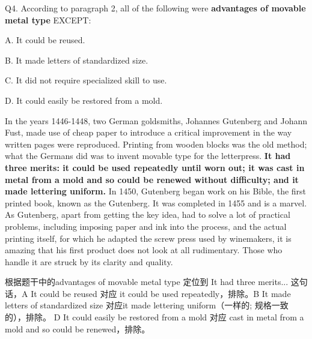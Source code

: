 \begin{blk}
    \begin{qst}
        Q4. According to paragraph 2, all of the following were \textbf{advantages of movable metal type} EXCEPT:
    \end{qst}

    \begin{chc}
        A. It could be reused.

        B. It made letters of standardized size.

        C. It did not require specialized skill to use.

        D. It could easily be restored from a mold.
    \end{chc}

    \begin{psgq}
        In the years 1446-1448, two German goldsmiths, Johannes Gutenberg and Johann Fust, made use of cheap paper to introduce a critical improvement in the way written pages were reproduced. Printing from wooden blocks was the old method; what the Germans did was to invent movable type for the letterpress. \textbf{It had three merits: it could be used repeatedly until worn out; it was cast in metal from a mold and so could be renewed without difficulty; and it made lettering uniform.} In 1450, Gutenberg began work on his Bible, the first printed book, known as the Gutenberg. It was completed in 1455 and is a marvel. As Gutenberg, apart from getting the key idea, had to solve a lot of practical problems, including imposing paper and ink into the process, and the actual printing itself, for which he adapted the screw press used by winemakers, it is amazing that his first product does not look at all rudimentary. Those who handle it are struck by its clarity and quality.
    \end{psgq}

    \begin{nlz}
        根据题干中的advantages of movable metal type 定位到 It had three merits... 这句话，A  It could be reused  对应 it could be used repeatedly，排除。B It made letters of standardized size 对应it made lettering uniform（一样的; 规格一致的），排除。 D It could easily be restored from a mold 对应 cast in metal from a mold and so could be renewed，排除。
    \end{nlz}
\end{blk}

